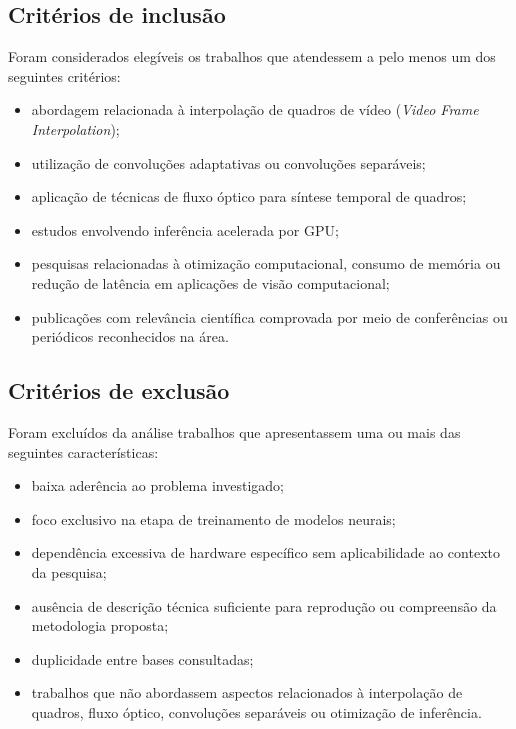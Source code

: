 \documentclass[
    12pt,                %
    openright,           %
    oneside,             %
    a4paper,             %
    english,             %
    brazil               %
]{abntex2}
\begin{document}
\subsection{Critérios de inclusão}

Foram considerados elegíveis os trabalhos que atendessem a pelo menos um dos seguintes critérios:

\begin{itemize}
    \item abordagem relacionada à interpolação de quadros de vídeo (\textit{Video Frame Interpolation});
    \item utilização de convoluções adaptativas ou convoluções separáveis;
    \item aplicação de técnicas de fluxo óptico para síntese temporal de quadros;
    \item estudos envolvendo inferência acelerada por GPU;
    \item pesquisas relacionadas à otimização computacional, consumo de memória ou redução de latência em aplicações de visão computacional;
    \item publicações com relevância científica comprovada por meio de conferências ou periódicos reconhecidos na área.
\end{itemize}

\subsection{Critérios de exclusão}

Foram excluídos da análise trabalhos que apresentassem uma ou mais das seguintes características:

\begin{itemize}
    \item baixa aderência ao problema investigado;
    \item foco exclusivo na etapa de treinamento de modelos neurais;
    \item dependência excessiva de hardware específico sem aplicabilidade ao contexto da pesquisa;
    \item ausência de descrição técnica suficiente para reprodução ou compreensão da metodologia proposta;
    \item duplicidade entre bases consultadas;
    \item trabalhos que não abordassem aspectos relacionados à interpolação de quadros, fluxo óptico, convoluções separáveis ou otimização de inferência.
\end{itemize}
\end{document}
